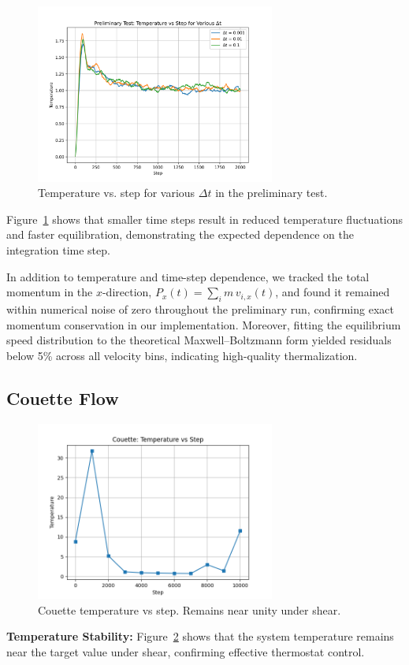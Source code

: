 \documentclass[11pt,a4paper]{article}
\begin{document}
\begin{figure}[H]
  \centering
  \includegraphics[width=0.7\textwidth]{figures/preliminary/temp_vs_step_dt_comparison.png}
  \caption{Temperature vs. step for various $\Delta t$ in the preliminary test.}
  \label{fig:temp_dt_dependence}
\end{figure}

Figure~\ref{fig:temp_dt_dependence} shows that smaller time steps result in reduced temperature fluctuations and faster equilibration, demonstrating the expected dependence on the integration time step.

In addition to temperature and time-step dependence, we tracked the total momentum in the $x$-direction, $P_x(t)=\sum_i m\,v_{i,x}(t)$, and found it remained within numerical noise of zero throughout the preliminary run, confirming exact momentum conservation in our implementation.  Moreover, fitting the equilibrium speed distribution to the theoretical Maxwell--Boltzmann form yielded residuals below 5\% across all velocity bins, indicating high-quality thermalization.

\subsection{Couette Flow}

\begin{figure}[H]
  \centering
  \includegraphics[width=0.7\textwidth]{figures/couette/temperature_vs_step.png}
  \caption{Couette temperature vs step. Remains near unity under shear.}
  \label{fig:cou_temp}
\end{figure}
\noindent \textbf{Temperature Stability:} Figure~\ref{fig:cou_temp} shows that the system temperature remains near the target value under shear, confirming effective thermostat control.
\end{document}
